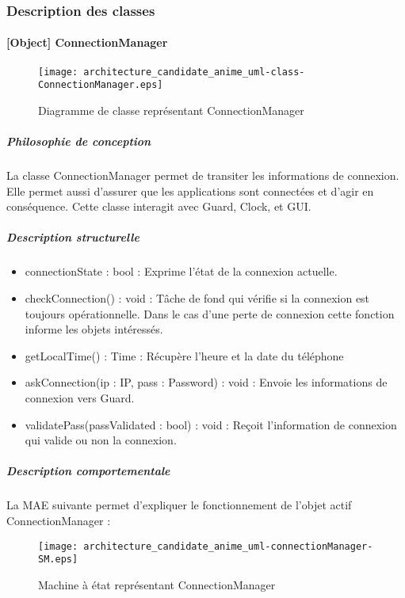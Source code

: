 \newpage

\subsubsection{Description des classes}%
    \paragraph{[Object] ConnectionManager}%
    \begin{figure} [H]
        \centering
        \texttt{[image: architecture\_candidate\_anime\_uml-class-ConnectionManager.eps]}
        \caption{Diagramme de classe représentant ConnectionManager}
        \label{Classe_ConnectionManager}
    \end{figure}
        \subparagraph{Philosophie de conception}%
        La classe ConnectionManager permet de transiter les informations de connexion.
        Elle permet aussi d'assurer que les applications sont connectées et d'agir en conséquence.
        Cette classe interagit avec Guard, Clock, et GUI.
        \subparagraph{Description structurelle}%
            \begin{itemize}
                \item connectionState : bool : Exprime l'état de la connexion actuelle.
            \end{itemize}
            \begin{itemize}
                \item {checkConnection() : void : Tâche de fond qui vérifie si la connexion est toujours opérationnelle.
                Dans le cas d'une perte de connexion cette fonction informe les objets intéressés.}
                \item {getLocalTime() : Time : Récupère l'heure et la date du téléphone}
                \item {askConnection(ip : IP, pass : Password) : void : Envoie les informations de connexion vers Guard.}
                \item {validatePass(passValidated : bool) : void : Reçoit l'information de connexion qui valide ou non la connexion.}
            \end{itemize}
\newpage
        \subparagraph{Description comportementale}%
        La MAE suivante permet d'expliquer le fonctionnement de l'objet actif ConnectionManager :
        \begin{figure} [H]
            \centering
            \texttt{[image: architecture\_candidate\_anime\_uml-connectionManager-SM.eps]}
            \caption{Machine à état représentant ConnectionManager}
            \label{MaE_ConnectionManager}     
        \end{figure}


